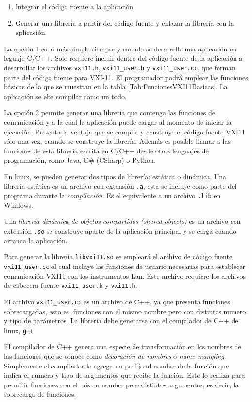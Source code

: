 \documentclass[paper=letter,oneside,fontsize=11pt, parskip=full]{scrartcl}
\begin{document}
	\begin{enumerate}
		\item Integrar el código fuente a la aplicación. 
		\item Generar una librería a partir del código fuente y enlazar la librería con la aplicación.
	\end{enumerate}	

	La opción 1 es la más simple siempre y cuando se desarrolle una aplicación en leguaje C/C++. Solo requiere incluir dentro del código fuente de la aplicación a desarrollar los archivos \texttt{vxi11.h}, \texttt{vxi11\_user.h} y \texttt{vxi11\_user.cc}, que forman parte del código fuente para VXI-11. El programador podrá emplear las funciones básicas de la que se muestran en la tabla \ref{Tab:FuncionesVXI11Basicas}. La aplicación se ebe compilar como un todo.
	
	La opción 2 permite generar una librería que contenga las funciones de comunicación y a la cual la aplicación puede cargar al momento de iniciar la ejecución. Presenta la ventaja que se compila y construye el código fuente VXI11 sólo una vez, cuando se construye la librería. Además es posible llamar a las funciones de esta librería escrita en C/C++ desde otros lenguajes de programación, como Java, C\# (CSharp) o Python.
	
	En linux, se pueden generar dos tipos de librería: estática o dinámica. Una librería estática es un archivo con extensión \texttt{.a}, esta se incluye como parte del programa durante la \emph{compilación}. Es el equivalente a un archivo \texttt{.lib} en Windows.
	
	Una \emph{librería dinámica de objetos compartidos (shared objects)} es un archivo con extensión \texttt{.so} se construye aparte de la aplicación principal y se carga cuando arranca la aplicación.
	
	Para generar la librería \texttt{libvxi11.so} se empleará el archivo de código fuente \texttt{vxi11\_user.cc} el cual incluye las funciones de usuario necesarias para establecer comunicación VXI11 con los instrumentos Lan. Este archivo requiere los archivos de cabecera fuente \texttt{vxi11\_user.h} y \texttt{vxi11.h}. 
	
	El archivo \texttt{vxi11\_user.cc} es un archivo de C++, ya que presenta funciones sobrecargadas, esto es, funciones con el mismo nombre pero con distintos numero y tipo de parámetros. La librería debe generarse con el compilador de C++ de linux, \texttt{g++}.
	
	El compilador de C++ genera una especie de transformación en los nombres de las funciones que se conoce como \emph{decoración de nombres} o \emph{name mangling}. Simplemente el compilador le agrega un prefijo al nombre de la función que indica el numero y tipo de argumentos que recibe la función. Esto lo realiza para permitir funciones con el mismo nombre pero distintos argumentos, es decir, la sobrecarga de funciones.  
	
\end{document}
